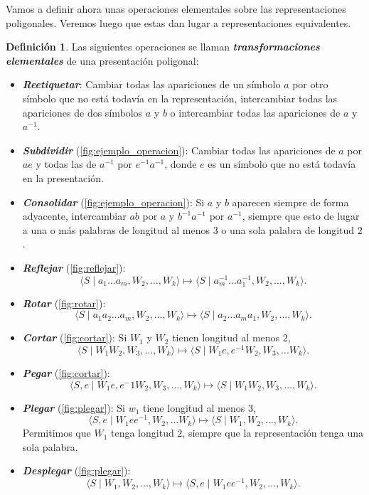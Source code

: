 \documentclass[10pt]{report}
\newcommand{\enfatiza}[1]{\textbf{\textit{#1}}}
\theoremstyle{definition}
\newtheorem{defin}{Definición}[section]
\begin{document}
Vamos a definir ahora unas operaciones elementales sobre las representaciones poligonales. Veremos luego que estas dan lugar a representaciones equivalentes.

\begin{defin}%
Las siguientes operaciones se llaman \enfatiza{transformaciones elementales} de una presentación poligonal:
\begin{itemize}
\item \enfatiza{Reetiquetar}: Cambiar todas las apariciones de un símbolo $a$ por otro símbolo que no está todavía en la representación, intercambiar todas las apariciones de dos símbolos $a$ y $b$ o intercambiar todas las apariciones de $a$ y $a^{-1}$.
\item \enfatiza{Subdividir} (\autoref{fig:ejemplo_operacion}): Cambiar todas las apariciones de $a$ por $ae$ y todas las de $a^{-1}$ por $e^{-1}a^{-1}$, donde $e$ es un símbolo que no está todavía en la presentación.
\item \enfatiza{Consolidar} (\autoref{fig:ejemplo_operacion}): Si $a$ y $b$ aparecen siempre de forma adyacente, intercambiar $ab$ por $a$ y $b^{-1}a^{-1}$ por $a^{-1}$, siempre que esto de lugar a una o más palabras de longitud al menos $3$ o una sola palabra de longitud $2$.
\item \enfatiza{Reflejar} (\autoref{fig:reflejar}): $$\langle S\mid   a_1 \dots a_m, W_2,\dots,W_k\rangle \mapsto \langle S\mid   a_m^{-1}\dots a_1^{-1}, W_2, \dots ,W_k\rangle .$$
\item \enfatiza{Rotar} (\autoref{fig:rotar}): $$\langle S\mid a_1a_2\dots a_m, W_2,\dots , W_k\rangle \mapsto \langle S\mid   a_2\dots a_ma_1, W_2,\dots , W_k\rangle .$$
\item \enfatiza{Cortar} (\autoref{fig:cortar}): Si $W_1$ y $W_2$ tienen longitud al menos $2$, $$\langle S\mid W_1W_2, W_3,\dots , W_k\rangle \mapsto \langle S\mid W_1e, e^{-1}W_2, W_3,\dots W_k\rangle .$$ 
\item \enfatiza{Pegar} (\autoref{fig:cortar}): $$\langle S,e\mid W_1e, e^-1W_2, W_3,\dots , W_k\rangle \mapsto \langle S\mid W_1W_2, W_3,\dots , W_k\rangle .$$
\item \enfatiza{Plegar} (\autoref{fig:plegar}): Si $w_1$ tiene longitud al menos $3$, $$\langle S,e\mid W_1ee^{-1}, W_2,\dots W_k\rangle \mapsto \langle S\mid W_1, W_2,\dots , W_k\rangle .$$ Permitimos que $W_1$ tenga longitud $2$, siempre que la representación tenga una sola palabra.
\item \enfatiza{Desplegar} (\autoref{fig:plegar}): $$\langle S\mid W_1, W_2,\dots , W_k\rangle \mapsto \langle S,e\mid W_1ee^{-1}, W_2,\dots , W_k\rangle .$$
\end{itemize}
\end{defin}
\end{document}
